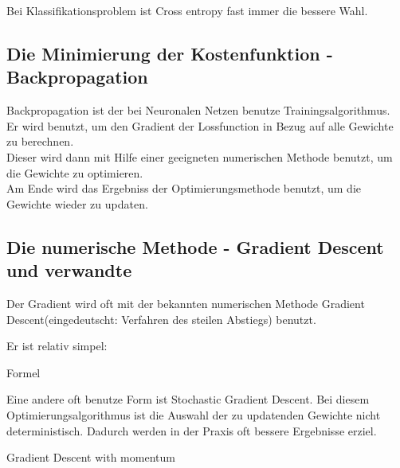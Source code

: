 Bei Klassifikationsproblem ist Cross entropy fast immer die bessere Wahl.

\subsection{Die Minimierung der Kostenfunktion - Backpropagation}
Backpropagation ist der bei Neuronalen Netzen benutze Trainingsalgorithmus. \\

Er wird benutzt, um den Gradient der Lossfunction in Bezug auf alle Gewichte zu berechnen. \\

Dieser wird dann mit Hilfe einer geeigneten numerischen Methode benutzt, um die Gewichte zu optimieren. \\

Am Ende wird das Ergebniss der Optimierungsmethode benutzt, um die Gewichte wieder zu updaten.

\subsection{Die numerische Methode - Gradient Descent und verwandte}

Der Gradient wird oft mit der bekannten numerischen Methode Gradient Descent(eingedeutscht: Verfahren des steilen Abstiegs) benutzt.

Er ist relativ simpel:

Formel

Eine andere oft benutze Form ist Stochastic Gradient Descent. Bei diesem Optimierungsalgorithmus ist die Auswahl der zu updatenden Gewichte nicht deterministisch. 
Dadurch werden in der Praxis oft bessere Ergebnisse erziel.

Gradient Descent with momentum